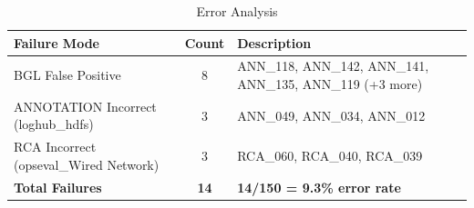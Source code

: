 \begin{table}[h]
\centering
\caption{Error Analysis}
\label{tab:error-analysis}
\begin{tabular}{lcp{8cm}}
\toprule
\textbf{Failure Mode} & \textbf{Count} & \textbf{Description} \\
\midrule
BGL False Positive & 8 & ANN_118, ANN_142, ANN_141, ANN_135, ANN_119 (+3 more) \\
ANNOTATION Incorrect (loghub_hdfs) & 3 & ANN_049, ANN_034, ANN_012 \\
RCA Incorrect (opseval_Wired Network) & 3 & RCA_060, RCA_040, RCA_039 \\
\midrule
\textbf{Total Failures} & \textbf{14} & \textbf{14/150 = 9.3\% error rate} \\
\bottomrule
\end{tabular}
\end{table}

